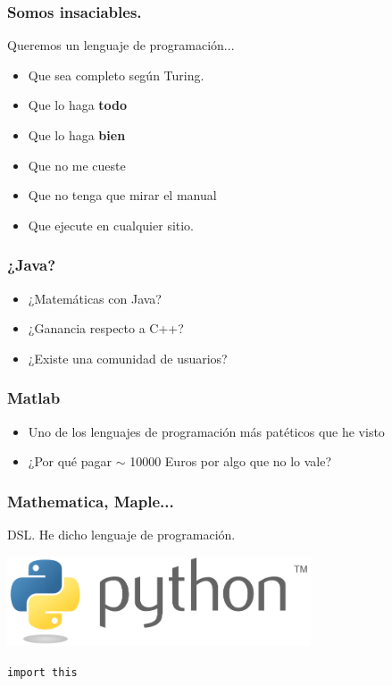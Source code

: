 \documentclass{beamer}
\begin{document}
\begin{frame}
  \frametitle{Somos insaciables.}
  Queremos un lenguaje de programación...
  \begin{itemize}
  \item Que sea completo según Turing.
  \item Que lo haga \textbf{todo}
  \item Que lo haga \textbf{bien}
  \item Que no me cueste
  \item Que no tenga que mirar el manual
  \item Que ejecute en cualquier sitio.
  \end{itemize}
\end{frame}

\begin{frame}
  \frametitle{¿Java?}
  \begin{itemize}
  \item ¿Matemáticas con Java?
  \item ¿Ganancia respecto a C++?
  \item ¿Existe una comunidad de usuarios?
  \end{itemize}
\end{frame}

\begin{frame}
  \frametitle{Matlab}
  \begin{itemize}
  \item Uno de los lenguajes de programación más patéticos que he
    visto
  \item ¿Por qué pagar $\sim$ 10000 Euros por algo que no lo vale?
  \end{itemize}
\end{frame}

\begin{frame}
  \frametitle{Mathematica, Maple...}
  \begin{center}
    DSL. He dicho lenguaje de programación.
  \end{center}
\end{frame}

\begin{frame}
  \begin{center}
    \includegraphics[width=9cm]{files/python-logo-generic.pdf}\\
  \end{center}
  \texttt{import this}
\end{frame}
\end{document}
